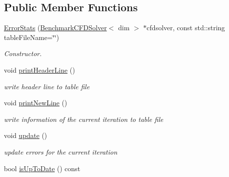 \subsection*{Public Member Functions}
\begin{DoxyCompactItemize}
\item 
\hyperlink{classnatrium_1_1ErrorStats_a1dcdc9cb0508c7f64a067efae4134754}{ErrorStats} (\hyperlink{classnatrium_1_1BenchmarkCFDSolver}{BenchmarkCFDSolver}$<$ dim $>$ $\ast$cfdsolver, const std::string tableFileName=\char`\"{}\char`\"{})
\begin{DoxyCompactList}\small\item\em Constructor. \item\end{DoxyCompactList}\item 
\hypertarget{classnatrium_1_1ErrorStats_ad8cc77e4ac7a50e030e9a49fe1a5bdba}{
void \hyperlink{classnatrium_1_1ErrorStats_ad8cc77e4ac7a50e030e9a49fe1a5bdba}{printHeaderLine} ()}
\label{classnatrium_1_1ErrorStats_ad8cc77e4ac7a50e030e9a49fe1a5bdba}

\begin{DoxyCompactList}\small\item\em write header line to table file \item\end{DoxyCompactList}\item 
\hypertarget{classnatrium_1_1ErrorStats_af02f31d82efefb482ea4ab3d69642486}{
void \hyperlink{classnatrium_1_1ErrorStats_af02f31d82efefb482ea4ab3d69642486}{printNewLine} ()}
\label{classnatrium_1_1ErrorStats_af02f31d82efefb482ea4ab3d69642486}

\begin{DoxyCompactList}\small\item\em write information of the current iteration to table file \item\end{DoxyCompactList}\item 
\hypertarget{classnatrium_1_1ErrorStats_ad24a8dae524127631e75368a0aac61b5}{
void \hyperlink{classnatrium_1_1ErrorStats_ad24a8dae524127631e75368a0aac61b5}{update} ()}
\label{classnatrium_1_1ErrorStats_ad24a8dae524127631e75368a0aac61b5}

\begin{DoxyCompactList}\small\item\em update errors for the current iteration \item\end{DoxyCompactList}\item 
\hypertarget{classnatrium_1_1ErrorStats_a72dcc0b8b86335a50ee1b324bbed0e61}{
bool \hyperlink{classnatrium_1_1ErrorStats_a72dcc0b8b86335a50ee1b324bbed0e61}{isUpToDate} () const }
\label{classnatrium_1_1ErrorStats_a72dcc0b8b86335a50ee1b324bbed0e61}


\end{DoxyCompactItemize}
